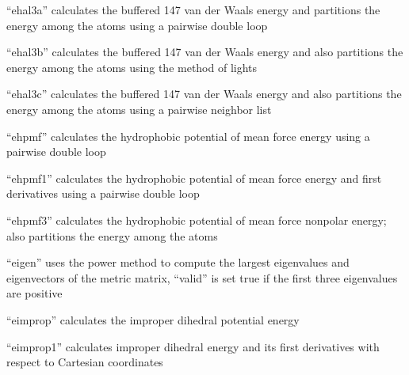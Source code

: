 \documentclass[letterpaper,11pt,english]{sphinxmanual}
\begin{document}

“ehal3a” calculates the buffered 14\sphinxhyphen{}7 van der Waals energy
and partitions the energy among the atoms using a pairwise
double loop


“ehal3b” calculates the buffered 14\sphinxhyphen{}7 van der Waals energy
and also partitions the energy among the atoms using the
method of lights


“ehal3c” calculates the buffered 14\sphinxhyphen{}7 van der Waals energy
and also partitions the energy among the atoms using a
pairwise neighbor list


“ehpmf” calculates the hydrophobic potential of mean force
energy using a pairwise double loop


“ehpmf1” calculates the hydrophobic potential of mean force
energy and first derivatives using a pairwise double loop


“ehpmf3” calculates the hydrophobic potential of mean force
nonpolar energy; also partitions the energy among the atoms


“eigen” uses the power method to compute the largest eigenvalues
and eigenvectors of the metric matrix, “valid” is set true if the
first three eigenvalues are positive







“eimprop” calculates the improper dihedral potential energy


“eimprop1” calculates improper dihedral energy and its
first derivatives with respect to Cartesian coordinates
\end{document}

